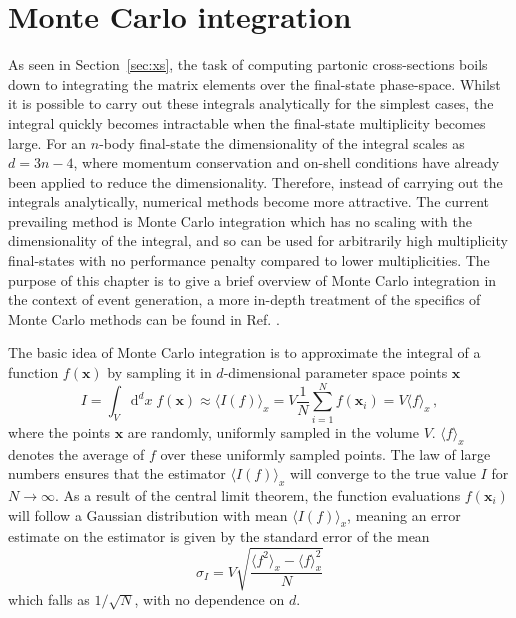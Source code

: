 \documentclass[main.tex]{subfiles}
\begin{document}
    \section{Monte Carlo integration}\label{sec:MC_integration}
    As seen in Section~\ref{sec:xs}, the task of
    computing partonic cross-sections boils down
    to integrating the matrix elements over the
    final-state phase-space. Whilst it is possible to
    carry out these integrals analytically for the simplest
    cases, the integral quickly becomes intractable when the
    final-state multiplicity becomes large. For an $n$-body
    final-state the dimensionality of the integral scales as $d=3n-4$,
    where momentum conservation and on-shell conditions
    have already been applied to reduce the dimensionality.
    Therefore, instead of carrying out the integrals analytically,
    numerical methods become more attractive. The current
    prevailing method is Monte Carlo integration which
    has no scaling with the dimensionality of the integral,
    and so can be used for arbitrarily high multiplicity final-states
    with no performance penalty compared to lower multiplicities.
    The purpose of this chapter is to give a brief overview
    of Monte Carlo integration in the context of event
    generation, a more in-depth treatment of the
    specifics of Monte Carlo methods can be found in Ref.
    \cite{James:1980yn}.

    The basic idea of Monte Carlo integration is to approximate
    the integral of a function $f(\mathbf{x})$ by sampling it
    in $d$-dimensional parameter space points $\mathbf{x}$
    \begin{equation}\label{eqn:MC_integration}
        I = \int_{V} \mathrm{d}^{d}x \; f(\mathbf{x}) \approx \langle I(f) \rangle_{x} = V \dfrac{1}{N} \sum_{i=1}^{N} f(\mathbf{x}_{i}) = V \langle f \rangle_{x} \, ,
    \end{equation}
    where the points $\mathbf{x}$ are randomly,
    uniformly sampled in the volume $V$. $\langle f \rangle_{x}$
    denotes the average of $f$ over these uniformly sampled
    points. The law of large numbers ensures that the
    estimator $\langle I(f) \rangle_{x}$ will converge to
    the true value $I$ for $N \rightarrow \infty$. As a
    result of the central limit theorem, the function evaluations
    $f(\mathbf{x}_{i})$ will follow a Gaussian distribution with
    mean $\langle I(f) \rangle_{x}$,
    meaning an error estimate on the estimator is given by
    the standard error of the mean
    \begin{equation}\label{eqn:MC_error}
        \sigma_{I} = V \sqrt{\dfrac{\langle f^{2} \rangle_{x} - \langle f \rangle_{x}^{2}}{N}}
    \end{equation}
    which falls as $1/\sqrt{N}$, with no dependence
    on $d$.
\end{document}
